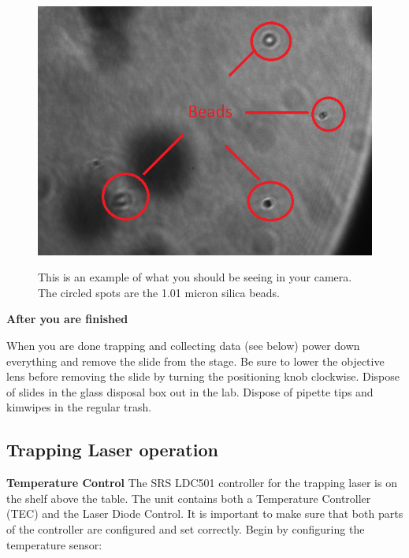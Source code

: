\documentclass{../lab}
\begin{document}
\begin{figure}[h]
    \centering
    \href{http://experimentationlab.berkeley.edu/sites/default/files/OTZ/Beads.png}{\includegraphics[width=0.7\linewidth]{images/Beads.png}}
    \caption{This is an example of what you should be seeing in your camera. The circled spots are the 1.01 micron silica beads.}
    \label{fig:Beads}
\end{figure}

\textbf{After you are finished}

When you are done trapping and collecting data (see below) power down everything and remove the slide from the stage. Be sure to lower the objective lens before removing the slide by turning the positioning knob clockwise.  Dispose of slides in the glass disposal box out in the lab. Dispose of pipette tips and kimwipes in the regular trash.

\subsection{Trapping Laser operation}

\textbf{Temperature Control} The SRS LDC501 controller for the trapping laser is on the shelf above the table. The unit contains both a Temperature Controller (TEC) and the Laser Diode Control. It is important to make sure that both parts of the controller are configured and set correctly. Begin by configuring the temperature sensor:
\end{document}
